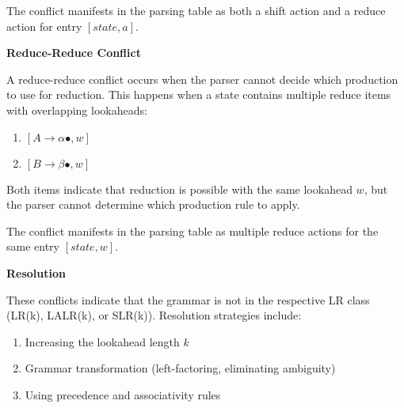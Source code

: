 The conflict manifests in the parsing table as both a shift action and a reduce action for entry $[state, a]$.


\textbf{Reduce-Reduce Conflict}

A reduce-reduce conflict occurs when the parser cannot decide which production to use for reduction. This happens when a state contains multiple reduce items with overlapping lookaheads:
\begin{enumerate}
\item $[A \to \alpha \bullet, w]$
\item $[B \to \beta \bullet, w]$
\end{enumerate}

Both items indicate that reduction is possible with the same lookahead $w$, but the parser cannot determine which production rule to apply.

The conflict manifests in the parsing table as multiple reduce actions for the same entry $[state, w]$.


\textbf{Resolution}

These conflicts indicate that the grammar is not in the respective LR class (LR(k), LALR(k), or SLR(k)). Resolution strategies include:
\begin{enumerate}
\item Increasing the lookahead length $k$
\item Grammar transformation (left-factoring, eliminating ambiguity)
\item Using precedence and associativity rules
\end{enumerate}
